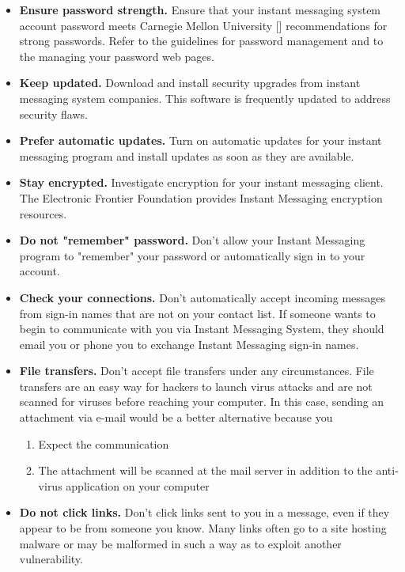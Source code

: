 \begin{itemize}
    \item \textbf{Ensure password strength.} Ensure that your instant messaging system account password meets Carnegie Mellon
    University [\cite{shay2010encountering}] recommendations for strong passwords.
    Refer to the guidelines for password management and to the managing your password web pages.
    \item \textbf{Keep updated.} Download and install security upgrades from instant messaging system companies.
    This software is frequently updated to address security flaws.
    \item \textbf{Prefer automatic updates.} Turn on automatic updates for your instant messaging program and install
    updates as soon as they are available.
    \item \textbf{Stay encrypted.} Investigate encryption for your instant messaging client.
    The Electronic Frontier Foundation provides Instant Messaging encryption resources.
    \item \textbf{Do not "remember" password.} Don't allow your Instant Messaging program to "remember" your password
    or automatically sign in to your account.
    \item \textbf{Check your connections.} Don't automatically accept incoming messages from sign-in names that are
    not on your contact list.
    If someone wants to begin to communicate with you via Instant Messaging System,
    they should email you or phone you to exchange Instant Messaging sign-in names.
    \item \textbf{File transfers.} Don't accept file transfers under any circumstances.
    File transfers are an easy way for hackers to launch virus attacks and are not scanned for viruses before reaching
    your computer.
    In this case, sending an attachment via e-mail would be a better alternative because you
    \begin{enumerate}
        \item Expect the communication
        \item The attachment will be scanned at the mail server in addition to the anti-virus application on your computer
    \end{enumerate}
    \item \textbf{Do not click links.} Don't click links sent to you in a message, even if they appear to be from
    someone you know.
    Many links often go to a site hosting malware or may be malformed in such a way as to exploit another vulnerability.

\end{itemize}
